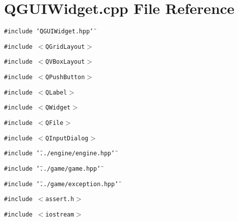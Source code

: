 \section{QGUIWidget.cpp File Reference}
\label{QGUIWidget_8cpp}
{\tt \#include \char`\"{}QGUIWidget.hpp\char`\"{}}\par
{\tt \#include $<$QGrid\-Layout$>$}\par
{\tt \#include $<$QVBox\-Layout$>$}\par
{\tt \#include $<$QPush\-Button$>$}\par
{\tt \#include $<$QLabel$>$}\par
{\tt \#include $<$QWidget$>$}\par
{\tt \#include $<$QFile$>$}\par
{\tt \#include $<$QInput\-Dialog$>$}\par
{\tt \#include \char`\"{}../engine/engine.hpp\char`\"{}}\par
{\tt \#include \char`\"{}../game/game.hpp\char`\"{}}\par
{\tt \#include \char`\"{}../game/exception.hpp\char`\"{}}\par
{\tt \#include $<$assert.h$>$}\par
{\tt \#include $<$iostream$>$}\par
